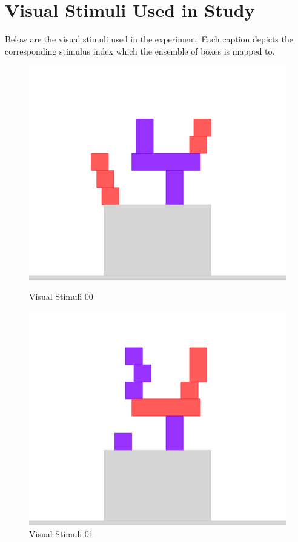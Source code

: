 \documentclass[10pt,letterpaper]{article}
\begin{document}
\newpage
\section{Visual Stimuli Used in Study}
\label{app:visual_stimuli}

Below are the visual stimuli used in the experiment. Each caption depicts the corresponding stimulus index which the ensemble of boxes is mapped to.

\begin{figure}[h]
    \parbox{.47\linewidth}{
        \centering
        \includegraphics[scale=0.3]{images/ensemble0.png}
        \caption{Visual Stimuli 00}
        \label{table:llama7B-fixed-deceiver-correlation}
    }
    \hfill
    \parbox{.47\linewidth}{
        \centering
        \includegraphics[scale=0.3]{images/ensemble1.png}
        \caption{Visual Stimuli 01}
        \label{table:llama13B-fixed-deceiver-correlation}
    }
\end{figure}
\end{document}
